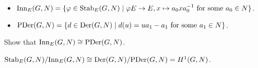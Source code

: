 \begin{definition} \mbox{}
  \begin{itemize}
    \item $\operatorname{Inn}_E(G, N) = \{ \varphi \in \operatorname{Stab}_E(G, N) \mid
      \varphi E \to E, x \mapsto a_0 x a_0^{-1} \text{~for some~} a_0 \in N \}$.
    \item $\operatorname{PDer}(G, N) = \{ d \in \operatorname{Der}(G, N) \mid
      d(u) = ua_1 - a_1 \text{~for some~} a_1 \in N \}$.
  \end{itemize}
\end{definition}

\begin{exercise}
  Show that $\operatorname{Inn}_E(G, N) \cong \operatorname{PDer}(G, N)$.
\end{exercise}

${\operatorname{Stab}_E(G, N)}/{\operatorname{Inn}_E(G, N)} \cong {\operatorname{Der}(G, N)}/{\operatorname{PDer}(G, N)}
= H^1(G, N)$.

